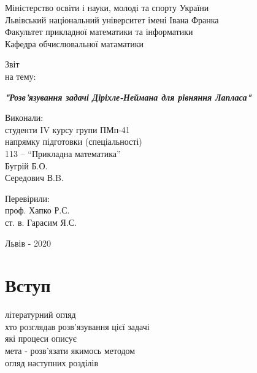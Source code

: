 \documentclass[14pt,a4paper]{extarticle}
\newcounter{e}
\newcounter{tabl}
\numberwithin{equation}{section}
\begin{document}
	

 \thispagestyle{empty}

 \begin{center}
	\large
	Міністерство освіти і науки, молоді та спорту України \\
	Львівський національний університет імені Івана Франка \\
	Факультет прикладної математики та інформатики \\
	Кафедра обчислювальної матаматики
 \end{center}

 \vspace{45pt}

 \vfill

 \begin{center}
	{\Huge{Звіт}}\\
	{\large на тему:}
 \end{center}

 \begin{center}\Large
	\textbf{\emph{"Розв'язування задачі Діріхле-Неймана для рівняння Лапласа"}}
 \end{center}

 \vfill
 \vskip100pt

 \begin{flushleft}
	\hskip8cm 
	Виконали:
	\\ \hskip8cm 
	студенти IV курсу групи ПМп-41
	\\ \hskip8cm
	напрямку підготовки (спеціальності)
	\\ \hskip8cm
	113 -- ``Прикладна математика''
	\\ \hskip8cm
	Бугрій Б.О.
	\\ \hskip8cm
	Середович В.B.
 \end{flushleft}

 \begin{flushleft}
	\hskip8cm 
	Перевірили:
	\\ \hskip8cm
	проф. Хапко Р.С.
	\\ \hskip8cm
	ст. в. Гарасим Я.С.
 \end{flushleft}

 \vfill

 \begin{center}
	\large
	Львів - 2020
 \end{center}

 \newpage
 \thispagestyle{empty}
 \tableofcontents

 \newpage
 \thispagestyle{empty}
 \section*{Вступ}
 \begin{center}\end{center}
 літературний огляд \\
 хто розглядав розв'язування цієї задачі \\
 які процеси описує \\
 мета - розв'язати якимось методом \\
 огляд наступних розділів
\end{document}
